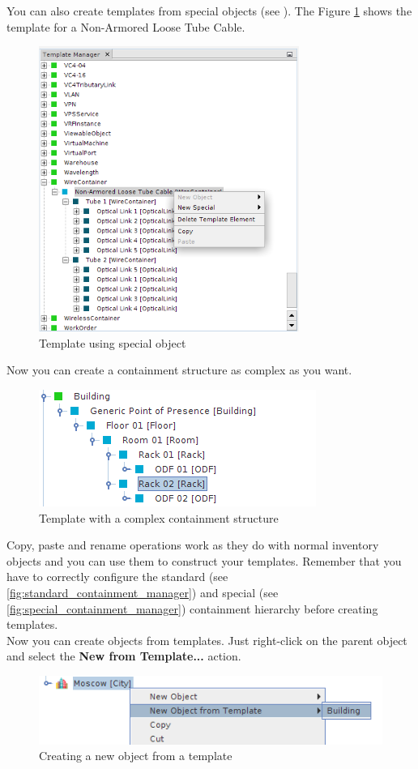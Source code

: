 \documentclass[a4paper]{article}
\begin{document}
	You can also create templates from special objects (see \textbf{}). The Figure \ref{fig:template_with_special_objects} shows the template for a Non-Armored Loose Tube Cable. 
	
	\begin{figure}[h!]
		\centering
		\includegraphics[width=0.5\linewidth]{img/template_with_special_objects.png}
		\caption{Template using special object}
		\label{fig:template_with_special_objects}
	\end{figure}
	
	Now you can create a containment structure as complex as you want.\\
	
	\begin{figure}[h!]
		\centering
		\includegraphics[width=0.6\linewidth]{img/template_manager_template_containment.png}
		\caption{Template with a complex containment structure}
		\label{fig:template_manager_template_containment}
	\end{figure}
	Copy, paste and rename operations work as they do with normal inventory objects and you can use them to construct your templates. Remember that you have to correctly configure the standard (see \ref{fig:standard_containment_manager}) and special (see \ref{fig:special_containment_manager}) containment hierarchy  before creating templates.\\
	Now you can create objects from templates. Just right-click on the parent object and select the \textbf{New from Template...} action.\\
	\begin{figure}[h!]
		\centering
		\includegraphics[width=0.6\linewidth]{img/template_manager_new_from_template.png}
		\caption{Creating a new object from a template}
		\label{fig:template_manager_new_from_template}
	\end{figure}
	
\end{document}
